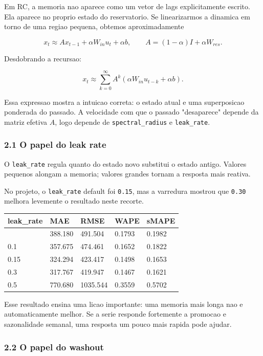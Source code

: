 \documentclass[12pt]{article}
\begin{document}
Em RC, a memoria nao aparece como um vetor de lags explicitamente escrito. Ela aparece no proprio estado do reservatorio. Se linearizarmos a dinamica em torno de uma regiao pequena, obtemos aproximadamente

\[
x_t \approx A x_{t-1} + \alpha W_{in} u_t + \alpha b,
\qquad
A = (1 - \alpha) I + \alpha W_{res}.
\]

Desdobrando a recursao:

\[
x_t \approx \sum_{k=0}^\infty A^k (\alpha W_{in} u_{t-k} + \alpha b).
\]

Essa expressao mostra a intuicao correta: o estado atual e uma superposicao ponderada do passado. A velocidade com que o passado "desaparece" depende da matriz efetiva \(A\), logo depende de \texttt{spectral\_radius} e \texttt{leak\_rate}.

\subsubsection{2.1 O papel do leak rate}\label{21-o-papel-do-leak-rate}

O \texttt{leak\_rate} regula quanto do estado novo substitui o estado antigo. Valores pequenos alongam a memoria; valores grandes tornam a resposta mais reativa.

No projeto, o \texttt{leak\_rate} default foi \texttt{0.15}, mas a varredura mostrou que \texttt{0.30} melhora levemente o resultado neste recorte.

\begin{longtable}[]{@{}lllll@{}}
\toprule\noalign{}
leak\_rate & MAE & RMSE & WAPE & sMAPE \\
\midrule\noalign{}
\endhead
\bottomrule\noalign{}
\endlastfoot
0.05 & 388.180 & 491.504 & 0.1793 & 0.1982 \\
0.1 & 357.675 & 474.461 & 0.1652 & 0.1822 \\
0.15 & 324.294 & 423.417 & 0.1498 & 0.1653 \\
0.3 & 317.767 & 419.947 & 0.1467 & 0.1621 \\
0.5 & 770.680 & 1035.544 & 0.3559 & 0.5702 \\
\end{longtable}

Esse resultado ensina uma licao importante: uma memoria mais longa nao e automaticamente melhor. Se a serie responde fortemente a promocao e sazonalidade semanal, uma resposta um pouco mais rapida pode ajudar.

\subsubsection{2.2 O papel do washout}\label{22-o-papel-do-washout}
\end{document}
